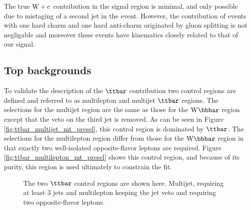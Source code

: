 The true $\mathrm{W+c}$ contribution in the signal region is minimal, 
and only possible due to mistaging of a second jet in
the event. However, the contribution of events
with one hard charm and one hard anti-charm originated by gluon 
splitting is not negligable and moreover these events have kinematics closely related 
to that of our signal. 

\subsection{Top backgrounds}
\label{section:topbackgrounds}

To validate the description of the $\ttbar$ contribution two 
control regions are defined and referred to as multilepton 
and multijet $\ttbar$ regions.
The selections for the multijet region are the same as 
those for the $\Wbb$ region except that the veto on the third jet is removed. 
As can be seen in Figure \ref{fig:ttbar_multijet_mt_presel}, this control region is dominated by $\ttbar$.
The selections for the multilepton region differ from those for the $\Wbb$ region in that exactly two well-isolated opposite-flavor leptons are required. 
Figure \ref{fig:ttbar_multilepton_mt_presel} shows this control region,
and because of its purity, this region is used ultimately to constrain the fit.

\begin{figure}
      \center
      \caption{The two $\ttbar$ control regions are shown here. Multijet, requiring at least 3 jets and multilepton keeping the jet veto and requiring two opposite-flavor leptons.
      }
      \label{fig:ttbar_presel}
\end{figure}


